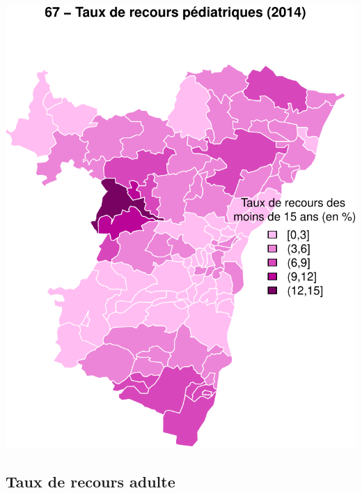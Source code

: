 \documentclass[]{article}
\begin{document}
\includegraphics{insee_files/figure-latex/unnamed-chunk-5-2.pdf}

\subsection{Taux de recours adulte}\label{taux-de-recours-adulte}
\end{document}
